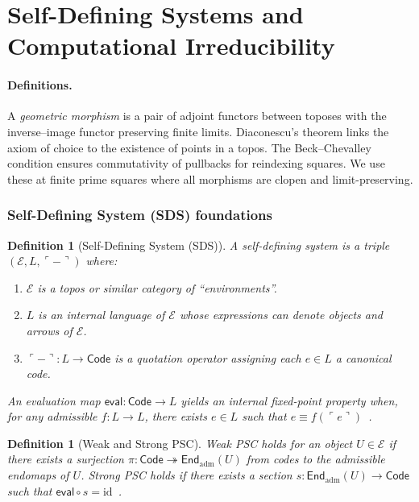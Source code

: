 \documentclass[12pt]{article}
\newtheorem{definition}[theorem]{Definition}
\numberwithin{equation}{section}
\begin{document}
\section{Self-Defining Systems and Computational Irreducibility}\label{sec:sds-analogues}

\paragraph{Definitions.}
A \emph{geometric morphism} is a pair of adjoint functors between toposes with the inverse–image functor preserving finite limits. Diaconescu's theorem links the axiom of choice to the existence of points in a topos. The Beck–Chevalley condition ensures commutativity of pullbacks for reindexing squares. We use these at finite prime squares where all morphisms are clopen and limit-preserving.

\subsubsection{Self-Defining System (SDS) foundations}\label{subsec:sds-foundations}

\begin{definition}[Self-Defining System (SDS)]\label{def:SDS}
A \emph{self-defining system} is a triple $(\mathcal{E}, L, \ulcorner-\urcorner)$ where:
\begin{enumerate}
\item $\mathcal{E}$ is a topos or similar category of ``environments''.
\item $L$ is an internal language of $\mathcal{E}$ whose expressions can denote objects and arrows of $\mathcal{E}$.
\item $\ulcorner-\urcorner: L \to \mathsf{Code}$ is a quotation operator assigning each $e \in L$ a canonical code.
\end{enumerate}
An \emph{evaluation} map $\mathsf{eval}: \mathsf{Code} \to L$ yields an internal fixed-point property when, for any admissible $f: L \to L$, there exists $e \in L$ such that $e \equiv f(\ulcorner e \urcorner)$~\cite{SpivackUGPFormalization,ugp-lean}.
\end{definition}

\begin{definition}[Weak and Strong PSC]\label{def:weak-strong-psc}
\emph{Weak PSC} holds for an object $U \in \mathcal{E}$ if there exists a surjection $\pi: \mathsf{Code} \twoheadrightarrow \mathsf{End}_{\mathrm{adm}}(U)$ from codes to the admissible endomaps of $U$.
\emph{Strong PSC} holds if there exists a \emph{section} $s: \mathsf{End}_{\mathrm{adm}}(U) \to \mathsf{Code}$ such that $\mathsf{eval} \circ s = \mathrm{id}$~\cite{SpivackUGPFormalization,ugp-lean}.
\end{definition}
\end{document}
